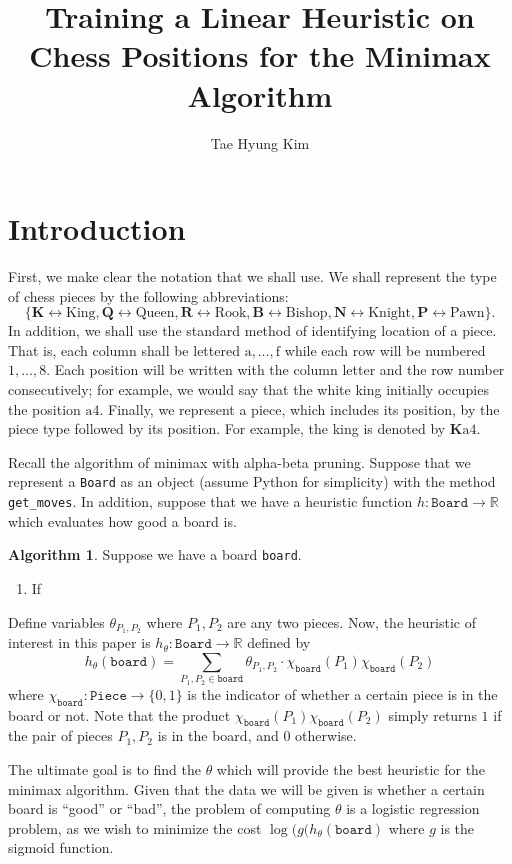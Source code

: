 \documentclass[11pt, letter]{article}
\title{Training a Linear Heuristic on Chess Positions for the Minimax Algorithm}
\author{Tae Hyung Kim}
\newcommand{\piece}[2]{\mathbf{#1}\text{#2}}
\theoremstyle{definition}
\newtheorem{alg}{Algorithm}
\begin{document}
\maketitle

\section{Introduction}
First, we make clear the notation that we shall use. We shall represent the type
of chess pieces by the following abbreviations:
\[\{ \mathbf{K} \leftrightarrow \text{King}, 
\mathbf{Q} \leftrightarrow \text{Queen},
\mathbf{R} \leftrightarrow \text{Rook},
\mathbf{B} \leftrightarrow \text{Bishop},
\mathbf{N} \leftrightarrow \text{Knight},
\mathbf{P} \leftrightarrow \text{Pawn}
\}. \]
In addition, we shall use the standard method of identifying location of a piece. 
That is, each column shall be lettered $\text{a}, \dots, \text{f}$ while each row
will be numbered $1, \dots, 8$. Each position will be written with the column
letter and the row number consecutively; for example, we would say that the
white king initially occupies the position $\text{a}4$. Finally, we represent a
piece, which includes its position, by the piece type followed by its position.
For example, the king is denoted by $\piece{K}{a4}$. 

Recall the algorithm of minimax with alpha-beta pruning. Suppose that we 
represent a \texttt{Board} as an object (assume Python for simplicity) with the
method \texttt{get\_moves}. In addition, suppose that we have a heuristic
function $h : \mathtt{Board} \to \mathbb R$ which evaluates how good a board is.
\renewcommand*{\thealg}{M}
\begin{alg}
    Suppose we have a board \texttt{board}.
    \begin{enumerate}[label=\textbf{\thealg\arabic*}.]
        \item If 
    \end{enumerate}
\end{alg}

Define variables $\theta_{P_1, P_2}$ where $P_1, P_2$ are any two pieces. 
Now, the heuristic of interest in this paper is $h_\theta : \mathtt{Board} \to
\mathbb{R}$ defined by
\[ h_\theta(\texttt{board}) = \sum_{P_1, P_2 \in \texttt{board}} \theta_{P_1, P_2} \cdot \chi_\texttt{board}(P_1) \chi_\texttt{board}(P_2) \]
where $\chi_\texttt{board} : \texttt{Piece} \to \{0, 1\}$ is the indicator of
whether a certain piece is in the board or not. Note that the product 
$\chi_\texttt{board}(P_1) \chi_\texttt{board}(P_2)$ simply returns $1$ if the
pair of pieces $P_1, P_2$ is in the board, and $0$ otherwise. 

The ultimate goal is to find the $\theta$ which will provide the best heuristic
for the minimax algorithm. Given that the data we will be given is whether a
certain board is ``good'' or ``bad'', the problem of computing $\theta$ is a
logistic regression problem, as we wish to minimize the cost $\log(g(h_\theta(\texttt{board})$ where $g$ is the sigmoid function. 
\end{document}

